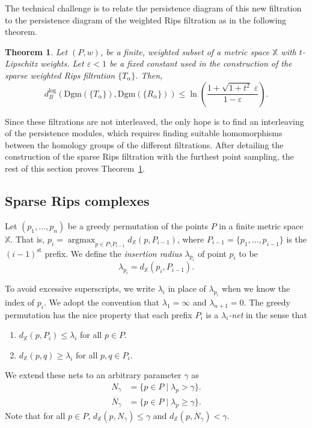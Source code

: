 \documentclass[a4paper]{article}
\newcommand\X{\mathbb{X}}
\newcommand\dX[2]{d_\X(#1,#2)}
\newcommand\Dgm[1]{\mathrm{Dgm}(#1)}
\newcommand\dbl{d_B^{\mathrm{log}}}
\newtheorem{theorem}{Theorem}[section]
\newcommand{\e}{\varepsilon}
\newcommand{\ir}{\lambda}
\newcommand{\net}{N}
\newcommand{\cl}[1]{\overline{#1}}
\DeclareMathOperator\argmax{argmax}
\begin{document}
The technical challenge is to relate the persistence diagram of this new filtration to the persistence diagram of the weighted Rips filtration as in the following theorem.

\begin{theorem}\label{thm:sparse_weighted_rips}
  Let $(P,w)$, be a finite, weighted subset of a metric space $\X$ with $t$-Lipschitz weights.
  Let $\e<1$ be a fixed constant used in the construction of the sparse weighted Rips filtration $\{T_\alpha\}$.
  Then,
  \[
    \dbl(\Dgm{\{T_\alpha\}}, \Dgm{\{R_\alpha\}}) \le \ln \left(\frac{1 + \sqrt{1+t^2}\;\e}{1-\e}\right).
  \]
\end{theorem}

Since these filtrations are not interleaved, the only hope is to find an interleaving of the persistence modules, which requires finding suitable homomorphisms between the homology groups of the different filtrations.
After detailing the construction of the sparse Rips filtration with the furthest point sampling, the rest of this section proves Theorem~\ref{thm:sparse_weighted_rips}.
\subsection{Sparse Rips complexes}\label{sec:sparse_rips_revisited}

Let $(p_1,\ldots, p_n)$ be a greedy permutation of the points $P$ in a finite metric space $\X$.
That is, $p_i = \argmax_{p\in P\setminus P_{i-1}} \dX{p}{P_{i-1}}$, where $P_{i-1} = \{p_1,\ldots,p_{i-1}\}$ is the $(i-1)^\mathrm{st}$ prefix.
  We define the \emph{insertion radius} $\ir_{p_i}$ of point $p_i$ to be
  \[
    \ir_{p_i} = \dX{p_i}{P_{i-1}}.
  \]
  
To avoid excessive superscripts, we write $\ir_i$ in place of $\ir_{p_i}$ when we know the index of $p_i$.
We adopt the convention that $\ir_1 = \infty$ and $\ir_{n+1} = 0$.
The greedy permutation has the nice property that each prefix $P_i$ is a \emph{$\ir_i$-net} in the sense that 
  \begin{enumerate}
    \item     $\dX{p}{P_i}\leq\ir_i$ for all $p\in P$.
    \item     $\dX{p}{q} \ge \ir_i$  for all $p,q\in P_i$.
  \end{enumerate}
  We extend these nets to an arbitrary parameter $\gamma$ as
  \begin{align*}
    \net_{\gamma} &= \{p\in P \mid \ir_p > \gamma\}.\\
    \cl\net_{\gamma} &= \{p\in P \mid \ir_p \ge \gamma\}.   
  \end{align*}
  Note that for all $p\in P$, $\dX{p}{\net_{\gamma}}\le \gamma$ and $\dX{p}{\cl\net_{\gamma}}< \gamma$.
  
\end{document}
